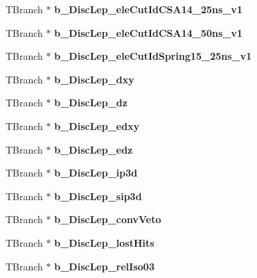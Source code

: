 \begin{DoxyCompactItemize}
T\+Branch $\ast$ {\bfseries b\+\_\+\+Disc\+Lep\+\_\+ele\+Cut\+Id\+C\+S\+A14\+\_\+25ns\+\_\+v1}
\item 
\hypertarget{classMiniTree_a47d5708eb8b18130f75586900aa46e94}{}\label{classMiniTree_a47d5708eb8b18130f75586900aa46e94} 
T\+Branch $\ast$ {\bfseries b\+\_\+\+Disc\+Lep\+\_\+ele\+Cut\+Id\+C\+S\+A14\+\_\+50ns\+\_\+v1}
\item 
\hypertarget{classMiniTree_a1496782f923c3ee72261a58f7c408195}{}\label{classMiniTree_a1496782f923c3ee72261a58f7c408195} 
T\+Branch $\ast$ {\bfseries b\+\_\+\+Disc\+Lep\+\_\+ele\+Cut\+Id\+Spring15\+\_\+25ns\+\_\+v1}
\item 
\hypertarget{classMiniTree_a3f7b5ee76d29478c44673eb1f8970730}{}\label{classMiniTree_a3f7b5ee76d29478c44673eb1f8970730} 
T\+Branch $\ast$ {\bfseries b\+\_\+\+Disc\+Lep\+\_\+dxy}
\item 
\hypertarget{classMiniTree_ad2dbcfd1dd3a1424018ba80d78a8caea}{}\label{classMiniTree_ad2dbcfd1dd3a1424018ba80d78a8caea} 
T\+Branch $\ast$ {\bfseries b\+\_\+\+Disc\+Lep\+\_\+dz}
\item 
\hypertarget{classMiniTree_a4cf8cf7c2fd57360e5db754123cfb830}{}\label{classMiniTree_a4cf8cf7c2fd57360e5db754123cfb830} 
T\+Branch $\ast$ {\bfseries b\+\_\+\+Disc\+Lep\+\_\+edxy}
\item 
\hypertarget{classMiniTree_a188d3518b05cf0712446249a5061b13f}{}\label{classMiniTree_a188d3518b05cf0712446249a5061b13f} 
T\+Branch $\ast$ {\bfseries b\+\_\+\+Disc\+Lep\+\_\+edz}
\item 
\hypertarget{classMiniTree_ae357af9cd03eb3ab8f206a4692a33e83}{}\label{classMiniTree_ae357af9cd03eb3ab8f206a4692a33e83} 
T\+Branch $\ast$ {\bfseries b\+\_\+\+Disc\+Lep\+\_\+ip3d}
\item 
\hypertarget{classMiniTree_ab79921e52a843c566f4e8560dd5fd0a4}{}\label{classMiniTree_ab79921e52a843c566f4e8560dd5fd0a4} 
T\+Branch $\ast$ {\bfseries b\+\_\+\+Disc\+Lep\+\_\+sip3d}
\item 
\hypertarget{classMiniTree_a348693ed04365f2d005a9138dd51a4fa}{}\label{classMiniTree_a348693ed04365f2d005a9138dd51a4fa} 
T\+Branch $\ast$ {\bfseries b\+\_\+\+Disc\+Lep\+\_\+conv\+Veto}
\item 
\hypertarget{classMiniTree_a65215b66049766740bf56aae03952e50}{}\label{classMiniTree_a65215b66049766740bf56aae03952e50} 
T\+Branch $\ast$ {\bfseries b\+\_\+\+Disc\+Lep\+\_\+lost\+Hits}
\item 
\hypertarget{classMiniTree_af521fa48d26256751cdc0041dd37422b}{}\label{classMiniTree_af521fa48d26256751cdc0041dd37422b} 
T\+Branch $\ast$ {\bfseries b\+\_\+\+Disc\+Lep\+\_\+rel\+Iso03}

\end{DoxyCompactItemize}
